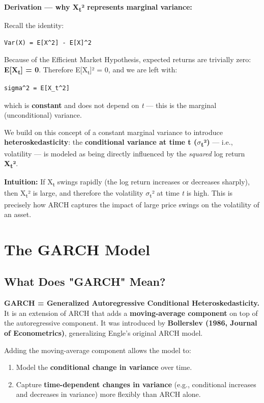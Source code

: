 \documentclass[12pt,openany]{book}
\theoremstyle{definition}
\theoremstyle{remark}
\begin{document}
\textbf{Derivation — why X\textsubscript{t}² represents marginal variance:}

Recall the identity:

\begin{lstlisting}[style=notesCode]
Var(X) = E[X^2] - E[X]^2
\end{lstlisting}

Because of the Efficient Market Hypothesis, expected returns are trivially zero: \textbf{E[X\textsubscript{t}] = 0}. Therefore E[X\textsubscript{t}]² = 0, and we are left with:

\begin{lstlisting}[style=notesCode]
sigma^2 = E[X_t^2]
\end{lstlisting}

which is \textbf{constant} and does not depend on \emph{t} — this is the marginal (unconditional) variance.

We build on this concept of a constant marginal variance to introduce \textbf{heteroskedasticity}: the \textbf{conditional variance at time t (\ensuremath{\sigma}\textsubscript{t}²)} — i.e., volatility — is modeled as being directly influenced by the \emph{squared} log return \textbf{X\textsubscript{t}²}.

\textbf{Intuition:} If X\textsubscript{t} swings rapidly (the log return increases or decreases sharply), then X\textsubscript{t}² is large, and therefore the volatility \ensuremath{\sigma}\textsubscript{t}² at time \emph{t} is high. This is precisely how ARCH captures the impact of large price swings on the volatility of an asset.


\section{The GARCH Model}

\subsection{What Does "GARCH" Mean?}

\textbf{GARCH = Generalized Autoregressive Conditional Heteroskedasticity.} It is an extension of ARCH that adds a \textbf{moving-average component} on top of the autoregressive component. It was introduced by \textbf{Bollerslev (1986, Journal of Econometrics)}, generalizing Engle's original ARCH model.

Adding the moving-average component allows the model to:
\begin{enumerate}
\item Model the \textbf{conditional change in variance} over time.
\item Capture \textbf{time-dependent changes in variance} (e.g., conditional increases and decreases in variance) more flexibly than ARCH alone.
\end{enumerate}
\end{document}
